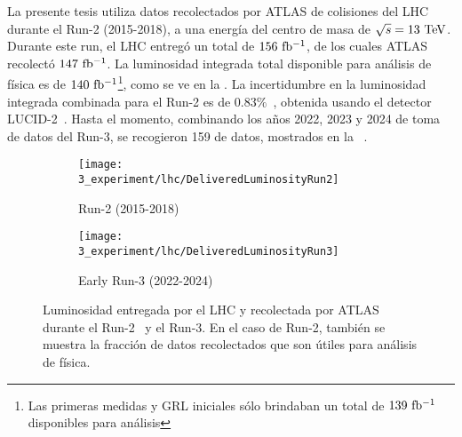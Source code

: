 La presente tesis utiliza datos recolectados por \ac{ATLAS} de colisiones \pp del \ac{LHC} durante el Run-2 (2015-2018), a una energía del centro de masa de \(\sqrt{s} = 13~\tev\). Durante este run, el \ac{LHC} entregó un total de \(156~\ifb\), de los cuales \ac{ATLAS} recolectó \(147~\ifb\). La luminosidad integrada total disponible para análisis de física es de \(140~\ifb\)\footnote{Las primeras medidas y \ac{GRL} iniciales sólo brindaban un total de \(139~\ifb\) disponibles para análisis}, como se ve en la \Fig{\ref{fig:atlas:runs:lumi_run2}}. La incertidumbre en la luminosidad integrada combinada para el Run-2 es de \(0.83\%\)~\cite{ATLAS-Lumi-Run2}, obtenida usando el detector LUCID-2~\cite{ATLAS-LUCID2}.
Hasta el momento, combinando los años 2022, 2023 y 2024 de toma de datos del Run-3, se recogieron 159 \ifb de datos, mostrados en la \Fig{\ref{fig:atlas:runs:lumi_run3}}~\cite{ATLAS-Lumi-Run3-2022,ATLAS-Lumi-Run3-2023}.

\begin{figure}[ht!]
    \centering
    \begin{subfigure}[h]{0.46\linewidth}
        \centering
        \texttt{[image: 3\_experiment/lhc/DeliveredLuminosityRun2]}
        \caption{Run-2 (2015-2018)}
        \label{fig:atlas:runs:lumi_run2}
    \end{subfigure}
    \hfill
    \begin{subfigure}[h]{0.46\linewidth}
        \centering
        \texttt{[image: 3\_experiment/lhc/DeliveredLuminosityRun3]}
        \caption{Early Run-3 (2022-2024)}
        \label{fig:atlas:runs:lumi_run3}
    \end{subfigure}
    \caption{Luminosidad entregada por el \ac{LHC} y recolectada por \ac{ATLAS} durante el Run-2~\cite{ATLAS-Lumi-Run2} y el Run-3. En el caso de Run-2, también se muestra la fracción de datos recolectados que son útiles para análisis de física.}
    \label{fig:atlas:runs:lumi}
\end{figure}

